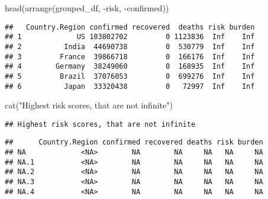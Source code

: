 \documentclass[
]{article}
\newenvironment{Shaded}{\begin{snugshade}}{\end{snugshade}}
\newcommand{\ConstantTok}[1]{\textcolor[rgb]{0.00,0.00,0.00}{#1}}
\newcommand{\FunctionTok}[1]{\textcolor[rgb]{0.00,0.00,0.00}{#1}}
\newcommand{\NormalTok}[1]{#1}
\newcommand{\SpecialCharTok}[1]{\textcolor[rgb]{0.00,0.00,0.00}{#1}}
\newcommand{\StringTok}[1]{\textcolor[rgb]{0.31,0.60,0.02}{#1}}
\begin{document}
\begin{Shaded}
\begin{Highlighting}[]
\FunctionTok{head}\NormalTok{(}\FunctionTok{arrange}\NormalTok{(grouped\_df, }\SpecialCharTok{{-}}\NormalTok{risk, }\SpecialCharTok{{-}}\NormalTok{confirmed))}
\end{Highlighting}
\end{Shaded}

\begin{verbatim}
##   Country.Region confirmed recovered  deaths risk burden
## 1             US 103802702         0 1123836  Inf    Inf
## 2          India  44690738         0  530779  Inf    Inf
## 3         France  39866718         0  166176  Inf    Inf
## 4        Germany  38249060         0  168935  Inf    Inf
## 5         Brazil  37076053         0  699276  Inf    Inf
## 6          Japan  33320438         0   72997  Inf    Inf
\end{verbatim}

\begin{Shaded}
\begin{Highlighting}[]
\FunctionTok{cat}\NormalTok{(}\StringTok{"Highest risk scores, that are not infinite"}\NormalTok{)}
\end{Highlighting}
\end{Shaded}

\begin{verbatim}
## Highest risk scores, that are not infinite
\end{verbatim}

\begin{Shaded}
\end{Shaded}

\begin{verbatim}
##      Country.Region confirmed recovered deaths risk burden
## NA             <NA>        NA        NA     NA   NA     NA
## NA.1           <NA>        NA        NA     NA   NA     NA
## NA.2           <NA>        NA        NA     NA   NA     NA
## NA.3           <NA>        NA        NA     NA   NA     NA
## NA.4           <NA>        NA        NA     NA   NA     NA
\end{verbatim}
\end{document}
